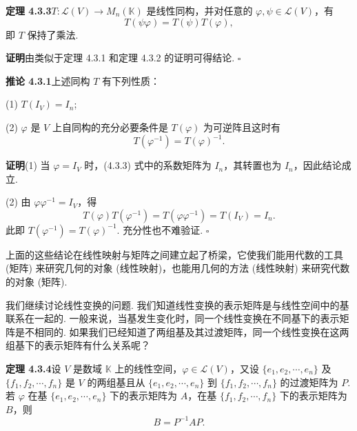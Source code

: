 \documentclass[UTF8, 12pt, fontset=fandol, oneside]{ctexart}
\begin{document}
\noindent\textbf{定理 4.3.3}\quad $T:\mathcal{L}(V)\to M_n(\mathbb{K})$ 是线性同构，并对任意的 $\varphi,\psi\in\mathcal{L}(V)$，有
\[
T(\psi\varphi)=T(\psi)T(\varphi),
\]
即 $T$ 保持了乘法.

\noindent\textbf{证明}\quad 由类似于定理 4.3.1 和定理 4.3.2 的证明可得结论. $\square$

\noindent\textbf{推论 4.3.1}\quad 上述同构 $T$ 有下列性质：

(1) $T(I_V)=I_n$;

(2) $\varphi$ 是 $V$ 上自同构的充分必要条件是 $T(\varphi)$ 为可逆阵且这时有
\[
T(\varphi^{-1})=T(\varphi)^{-1}.
\]

\noindent\textbf{证明}\quad (1) 当 $\varphi=I_V$ 时，(4.3.3) 式中的系数矩阵为 $I_n$，其转置也为 $I_n$，因此结论成立.

(2) 由 $\varphi\varphi^{-1}=I_V$，得
\[
T(\varphi)T(\varphi^{-1})=T(\varphi\varphi^{-1})=T(I_V)=I_n.
\]
此即 $T(\varphi^{-1})=T(\varphi)^{-1}$. 充分性也不难验证. $\square$

上面的这些结论在线性映射与矩阵之间建立起了桥梁，它使我们能用代数的工具 (矩阵) 来研究几何的对象 (线性映射)，也能用几何的方法 (线性映射) 来研究代数的对象 (矩阵).

我们继续讨论线性变换的问题. 我们知道线性变换的表示矩阵是与线性空间中的基联系在一起的. 一般来说，当基发生变化时，同一个线性变换在不同基下的表示矩阵是不相同的. 如果我们已经知道了两组基及其过渡矩阵，同一个线性变换在这两组基下的表示矩阵有什么关系呢？

\noindent\textbf{定理 4.3.4}\quad 设 $V$ 是数域 $\mathbb{K}$ 上的线性空间，$\varphi\in\mathcal{L}(V)$，又设 $\{e_1,e_2,\cdots,e_n\}$ 及 $\{f_1,f_2,\cdots,f_n\}$ 是 $V$ 的两组基且从 $\{e_1,e_2,\cdots,e_n\}$ 到 $\{f_1,f_2,\cdots,f_n\}$ 的过渡矩阵为 $P$. 若 $\varphi$ 在基 $\{e_1,e_2,\cdots,e_n\}$ 下的表示矩阵为 $A$，在基 $\{f_1,f_2,\cdots,f_n\}$ 下的表示矩阵为 $B$，则
\[
B=P^{-1}AP.
\]
\end{document}

